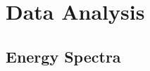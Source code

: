 \documentclass[fleqn,usenatbib,twocolumn]{mnras}%
\begin{document}
\section{Data Analysis}\label{sec:data_analysis}

\subsection{Energy Spectra}

\end{document}
